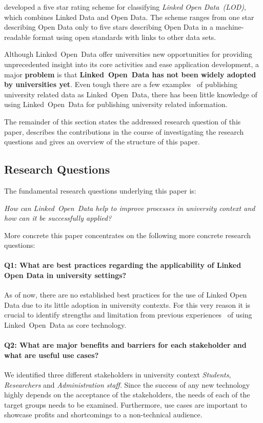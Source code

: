 \documentclass{article}
\begin{document}
\citet{artivle:bernerslee-t-2006-1} developed a five star rating scheme for classifying \textit{Linked Open Data~(LOD)}, which combines Linked Data and Open Data. The scheme ranges from one star describing Open Data only to five stars describing Open Data in a machine-readable format using open standards with links to other data sets.

Although Linked~Open~Data offer universities new opportunities for providing unprecedented insight into its core activities and ease application development, a major \textbf{problem} is that \textbf{Linked~Open~Data has not been widely adopted by universities yet}. Even tough there are a few examples~\cite{url:linked-universities-members} of publishing university related data as Linked~Open~Data, there has been little knowledge of using Linked~Open~Data for publishing university related information. 

The remainder of this section states the addressed research question of this paper, describes the contributions in the course of investigating the research questions and gives an overview of the structure of this paper.

\subsection{Research Questions}
The fundamental research questions underlying this paper is:
\begin{displayquote}
\textit{How can Linked~Open~Data help to improve processes in university context and how can it be successfully applied?}
\end{displayquote}
More concrete this paper concentrates on the following more concrete research questions:
\paragraph{Q1: What are best practices regarding the applicability of Linked Open Data in university settings?}
As of now, there are no established best practices for the use of Linked Open Data due to its little adoption in university contexts. For this very reason it is crucial to identify strengths and limitation from previous experiences~\cite{url:linked-universities-members} of using Linked~Open~Data as core technology. 
\paragraph{Q2: What are major benefits and barriers for each stakeholder and what are useful use cases?}
We identified three different stakeholders in university context \textit{Students}, \textit{Researchers} and \textit{Administration staff}. Since the success of any new technology highly depends on the acceptance of the stakeholders, the needs of each of the target groups needs to be examined. Furthermore, use cases are important to showcase profits and shortcomings to a non-technical audience. 
\end{document}
